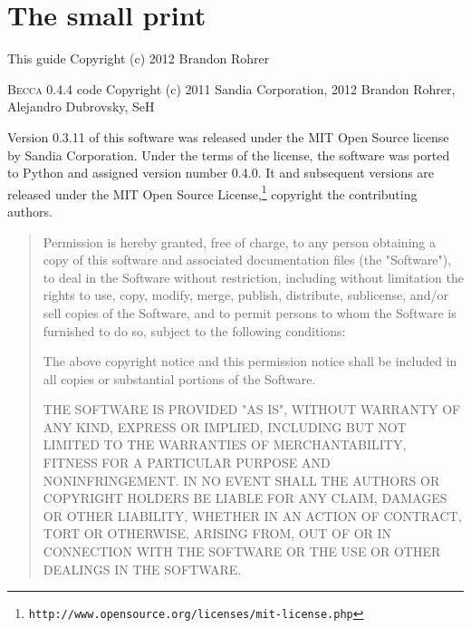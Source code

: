 \chapter{The small print}

This guide
Copyright (c) 2012 Brandon Rohrer

\textsc{Becca} 0.4.4 code
Copyright (c) 2011 Sandia Corporation,
2012 Brandon Rohrer, Alejandro Dubrovsky, SeH

Version 0.3.11 of this software was released under the MIT Open Source 
license by Sandia Corporation. Under the terms of the license, the 
software was ported to Python and assigned version number 0.4.0. It and
subsequent versions are released under the MIT Open Source License,\footnote{\texttt{http://www.opensource.org/licenses/mit-license.php}} copyright the contributing authors.

\begin{quote}
Permission is hereby granted, free of charge, to any person obtaining a copy
of this software and associated documentation files (the "Software"), to deal
in the Software without restriction, including without limitation the rights
to use, copy, modify, merge, publish, distribute, sublicense, and/or sell
copies of the Software, and to permit persons to whom the Software is
furnished to do so, subject to the following conditions:

The above copyright notice and this permission notice shall be included in
all copies or substantial portions of the Software.

THE SOFTWARE IS PROVIDED "AS IS", WITHOUT WARRANTY OF ANY KIND, EXPRESS OR
IMPLIED, INCLUDING BUT NOT LIMITED TO THE WARRANTIES OF MERCHANTABILITY,
FITNESS FOR A PARTICULAR PURPOSE AND NONINFRINGEMENT. IN NO EVENT SHALL THE
AUTHORS OR COPYRIGHT HOLDERS BE LIABLE FOR ANY CLAIM, DAMAGES OR OTHER
LIABILITY, WHETHER IN AN ACTION OF CONTRACT, TORT OR OTHERWISE, ARISING FROM,
OUT OF OR IN CONNECTION WITH THE SOFTWARE OR THE USE OR OTHER DEALINGS IN
THE SOFTWARE.

\end{quote}